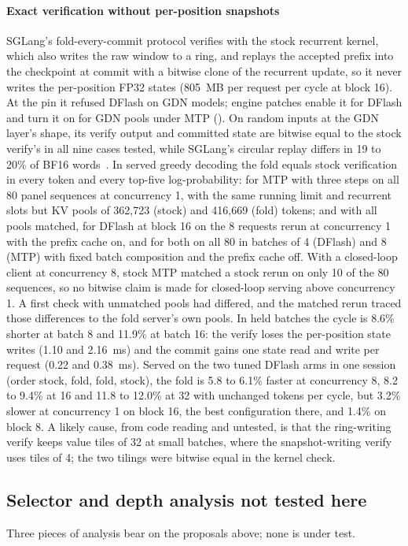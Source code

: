 \paragraph{Exact verification without per-position snapshots} SGLang's fold-every-commit protocol verifies with the stock recurrent kernel, which also writes the raw window to a ring, and replays the accepted prefix into the checkpoint at commit with a bitwise clone of the recurrent update, so it never writes the per-position FP32 states (805~MB per request per cycle at block 16). At the pin it refused DFlash on GDN models; engine patches enable it for DFlash and turn it on for GDN pools under MTP (). On random inputs at the GDN layer's shape, its verify output and committed state are bitwise equal to the stock verify's in all nine cases tested, while SGLang's circular replay differs in 19 to 20\% of BF16 words~. In served greedy decoding the fold equals stock verification in every token and every top-five log-probability: for MTP with three steps on all 80 panel sequences at concurrency 1, with the same running limit and recurrent slots but KV pools of 362,723 (stock) and 416,669 (fold) tokens; and with all pools matched, for DFlash at block 16 on the 8 requests rerun at concurrency 1 with the prefix cache on, and for both on all 80 in batches of 4 (DFlash) and 8 (MTP) with fixed batch composition and the prefix cache off. With a closed-loop client at concurrency 8, stock MTP matched a stock rerun on only 10 of the 80 sequences, so no bitwise claim is made for closed-loop serving above concurrency 1. A first check with unmatched pools had differed, and the matched rerun traced those differences to the fold server's own pools. In held batches the cycle is 8.6\% shorter at batch 8 and 11.9\% at batch 16: the verify loses the per-position state writes (1.10 and 2.16~ms) and the commit gains one state read and write per request (0.22 and 0.38~ms). Served on the two tuned DFlash arms in one session (order stock, fold, fold, stock), the fold is 5.8 to 6.1\% faster at concurrency 8, 8.2 to 9.4\% at 16 and 11.8 to 12.0\% at 32 with unchanged tokens per cycle, but 3.2\% slower at concurrency 1 on block 16, the best configuration there, and 1.4\% on block 8. A likely cause, from code reading and untested, is that the ring-writing verify keeps value tiles of 32 at small batches, where the snapshot-writing verify uses tiles of 4; the two tilings were bitwise equal in the kernel check.

\subsection{Selector and depth analysis not tested here}\label{app:untested}
Three pieces of analysis bear on the proposals above; none is under test.

